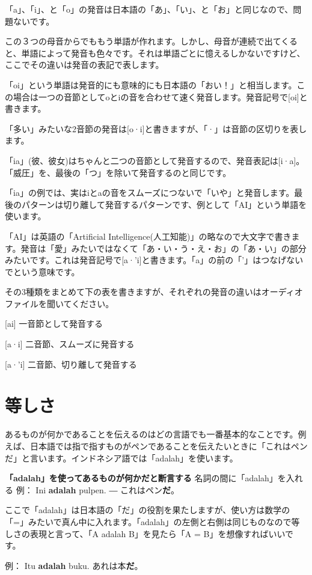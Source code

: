 \documentclass[uplatex]{jsarticle}
\begin{document}
「a」、「i」、と「o」の発音は日本語の「あ」、「い」、と「お」と同じなので、問題ないです。

この３つの母音からでももう単語が作れます。しかし、母音が連続で出てくると、単語によって発音も色々です。それは単語ごとに憶えるしかないですけど、ここでその違いは発音の表記で表します。

「oi」という単語は発音的にも意味的にも日本語の「おい！」と相当します。この場合は一つの音節としてoとiの音を合わせて速く発音します。発音記号で[oi]と書きます。

「多い」みたいな2音節の発音は[o·i]と書きますが、「·」は音節の区切りを表します。

「ia」(彼、彼女)はちゃんと二つの音節として発音するので、発音表記は[i·a]。「威圧」を、最後の「つ」を除いて発音するのと同じです。

「ia」の例では、実はiとaの音をスムーズにつないで「いや」と発音します。最後のパターンは切り離して発音するパターンです、例として「AI」という単語を使います。

「AI」は英語の「Artificial Intelligence(人工知能)」の略なので大文字で書きます。発音は「愛」みたいではなくて「あ・い・う・え・お」の「あ・い」の部分みたいです。これは発音記号で[a·'i]と書きます。「a」の前の「'」はつなげないでという意味です。

その3種類をまとめて下の表を書きますが、それぞれの発音の違いはオーディオファイルを聞いてください。

[ai]		一音節として発音する

[a·i]		二音節、スムーズに発音する

[a·'i]		二音節、切り離して発音する

\section{等しさ}

あるものが何かであることを伝えるのはどの言語でも一番基本的なことです。例えば、日本語では指で指すものがペンであることを伝えたいときに「これはペンだ」と言います。インドネシア語では「adalah」を使います。

\textbf{「adalah」を使ってあるものが何かだと断言する}
名詞の間に「adalah」を入れる
例： Ini \textbf{adalah} pulpen. ― これはペン\textbf{だ}。

ここで「adalah」は日本語の「だ」の役割を果たしますが、使い方は数学の「=」みたいで真ん中に入れます。「adalah」の左側と右側は同じものなので等しさの表現と言って、「A adalah B」を見たら「A = B」を想像すればいいです。

例：
Itu \textbf{adalah} buku.
あれは本\textbf{だ}。
\end{document}
